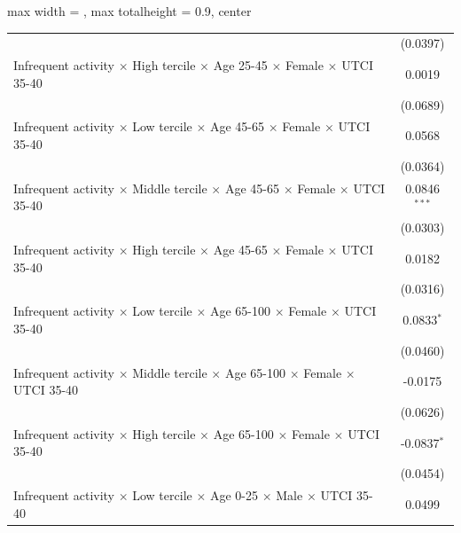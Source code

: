 \begin{table}[htbp]
\begin{adjustbox}{max width = \textwidth, max totalheight = 0.9\textheight, center}
\begin{tabular}{lc}
                                                                                                                 & (0.0397)\\   
         Infrequent activity $\times$ High tercile $\times$ Age 25-45 $\times$ Female $\times$ UTCI 35-40        & 0.0019\\   
                                                                                                                 & (0.0689)\\   
         Infrequent activity $\times$ Low tercile $\times$ Age 45-65 $\times$ Female $\times$ UTCI 35-40         & 0.0568\\   
                                                                                                                 & (0.0364)\\   
         Infrequent activity $\times$ Middle tercile $\times$ Age 45-65 $\times$ Female $\times$ UTCI 35-40      & 0.0846$^{***}$\\   
                                                                                                                 & (0.0303)\\   
         Infrequent activity $\times$ High tercile $\times$ Age 45-65 $\times$ Female $\times$ UTCI 35-40        & 0.0182\\   
                                                                                                                 & (0.0316)\\   
         Infrequent activity $\times$ Low tercile $\times$ Age 65-100 $\times$ Female $\times$ UTCI 35-40        & 0.0833$^{*}$\\   
                                                                                                                 & (0.0460)\\   
         Infrequent activity $\times$ Middle tercile $\times$ Age 65-100 $\times$ Female $\times$ UTCI 35-40     & -0.0175\\   
                                                                                                                 & (0.0626)\\   
         Infrequent activity $\times$ High tercile $\times$ Age 65-100 $\times$ Female $\times$ UTCI 35-40       & -0.0837$^{*}$\\   
                                                                                                                 & (0.0454)\\   
         Infrequent activity $\times$ Low tercile $\times$ Age 0-25 $\times$ Male $\times$ UTCI 35-40            & 0.0499\\   

\end{tabular}
\end{adjustbox}
\end{table}
